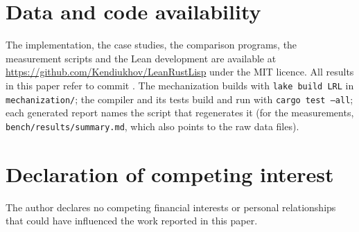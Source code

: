 \section*{Data and code availability}

The implementation, the case studies, the comparison programs, the measurement scripts and the Lean development are available at \url{https://github.com/Kendiukhov/LeanRustLisp} under the MIT licence.
All results in this paper refer to commit \texttt{\PinnedCommit}.
The mechanization builds with \texttt{lake build LRL} in \texttt{mechanization/}; the compiler and its \NumTestsPassed{} tests build and run with \texttt{cargo test --all}; each generated report names the script that regenerates it (for the measurements, \texttt{bench/\allowbreak results/\allowbreak summary.md}, which also points to the raw data files).

\section*{Declaration of competing interest}

The author declares no competing financial interests or personal relationships that could have influenced the work reported in this paper.
